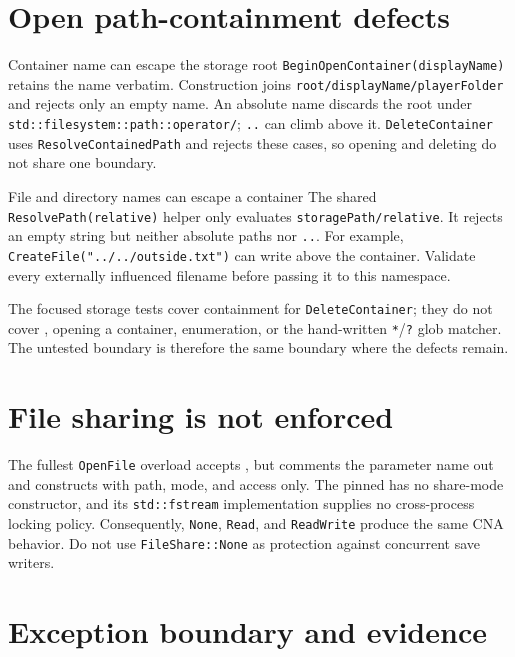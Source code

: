 \section{Open path-containment defects}

\begin{limitationnote}{Container name can escape the storage root}
\texttt{BeginOpenContainer(displayName)} retains the name verbatim. Construction joins
\texttt{root/displayName/playerFolder} and rejects only an empty name. An absolute name discards
the root under \texttt{std::filesystem::path::operator/}; \texttt{..} can climb above it.
\texttt{DeleteContainer} uses \texttt{ResolveContainedPath} and rejects these cases, so opening
and deleting do not share one boundary.
\end{limitationnote}

\begin{limitationnote}{File and directory names can escape a container}
The shared \texttt{ResolvePath(relative)} helper only evaluates
\texttt{storagePath/relative}. It rejects an empty string but neither absolute paths nor
\texttt{..}. For example, \texttt{CreateFile("../../outside.txt")} can write above the
container. Validate every externally influenced filename before passing it to this namespace.
\end{limitationnote}

The focused storage tests cover containment for \texttt{DeleteContainer}; they do not cover
, opening a container, enumeration, or the hand-written
\texttt{*}/\texttt{?} glob matcher. The untested boundary is therefore the same boundary where
the defects remain.

\section{File sharing is not enforced}

The fullest \texttt{OpenFile} overload accepts , but comments
the parameter name out and constructs  with path, mode, and access only.
The pinned  has no share-mode constructor, and its
\texttt{std::fstream} implementation supplies no cross-process locking policy. Consequently,
\texttt{None}, \texttt{Read}, and \texttt{ReadWrite} produce the same CNA behavior. Do not use
\texttt{FileShare::None} as protection against concurrent save writers.

\section{Exception boundary and evidence}


